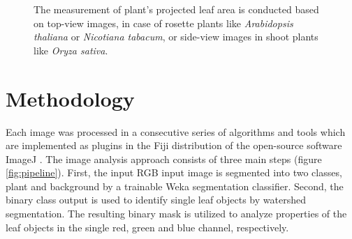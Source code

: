 \documentclass[paper=A4,bibliography=totocnumbered]{scrartcl}
\begin{document}
\begin{figure}
	\centering
	\qquad
	\caption[Measurement of plant's projected leaf area]{The measurement of plant's projected leaf area is conducted based on top-view images, in case of rosette plants like \textit{Arabidopsis thaliana} or \textit{Nicotiana tabacum}, or side-view images in shoot plants like \textit{Oryza sativa}.}
	\label{fig:PLA}
\end{figure}

\clearpage
\section{Methodology}
Each image was processed in a consecutive series of algorithms and tools which are implemented as plugins in the Fiji distribution \citep{Schindelin.2012} of the open-source software ImageJ \citep{Rueden.2017}. The image analysis approach consists of three main steps (figure \ref{fig:pipeline}). First, the input RGB input image is segmented into two classes, plant and background by a trainable Weka segmentation classifier. Second, the binary class output is used to identify single leaf objects by watershed segmentation. The resulting binary mask is utilized to analyze properties of the leaf objects in the single red, green and blue channel, respectively.
\end{document}
